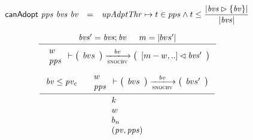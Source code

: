 \begin{equation}
  \label{eq:predicate:canadopt}
  \begin{array}{r c l}
    \mathsf{canAdopt}~\mathit{pps}~\mathit{bvs}~\mathit{bv}
    & =
    & \mathit{upAdptThr} \mapsto t \in pps \wedge
    t \leq \dfrac{\left| \mathit{bvs} \rhd \{\mathit{bv}\} \right|}{\left| \mathit{bvs} \right|}\\
  \end{array}
\end{equation}

\begin{figure}[htb]
  \begin{equation}
    \label{eq:rule:snocbv}
    \inference
    {
      \var{bvs'} = \var{bvs};\var{bv} & m = \size{bvs'}
    }
    {
      {
        \begin{array}{l}
          w\\
          \var{pps}
        \end{array}
      }
      \vdash
      {
        \left(
          \begin{array}{l}
            bvs
          \end{array}
        \right)
      }
      \trans{snocbv}{bv}
      {
        \left(
          \begin{array}{l}
            {[m - w, ..]} \restrictdom \var{bvs'}
          \end{array}
        \right)
      }
    }
  \end{equation}
  \nextdef
  \begin{equation}
    \label{eq:rule:up-adopted}
    \inference
    {
      \var{bv} \leq \var{pv_c}
      &
      {
        \begin{array}{l}
          w\\
          \var{pps}
        \end{array}
      }
      \vdash
      {
        \left(
          \begin{array}{l}
            bvs
          \end{array}
        \right)
      }
      \trans{snocbv}{bv}
      {
        \left(
          \begin{array}{l}
            bvs'
          \end{array}
        \right)
      }
    }
    {
      {
        \begin{array}{l}
          k\\
          w\\
          b_n\\
          (\var{pv}, \var{pps})\\

\end{array}}}
\end{equation}
\end{figure}
